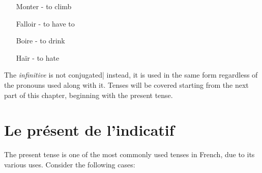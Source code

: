 \documentclass[11pt, oneside]{book}
\begin{document}
\begin{enumerate}
    \item[Monter] - to climb
	\item[Falloir] - to have to
	\item[Boire] - to drink
	\item[Ha\"ir] - to hate
\end{enumerate}

The \textit{infinitive} is not conjugated| instead, it is used in the same form regardless of the pronouns used along with it. Tenses will be covered starting from the next part of this chapter, beginning with the present tense.

\section{Le pr\'esent de l'indicatif}

The present tense is one of the most commonly used tenses in French, due to its various uses. Consider the following cases:
\end{document}
